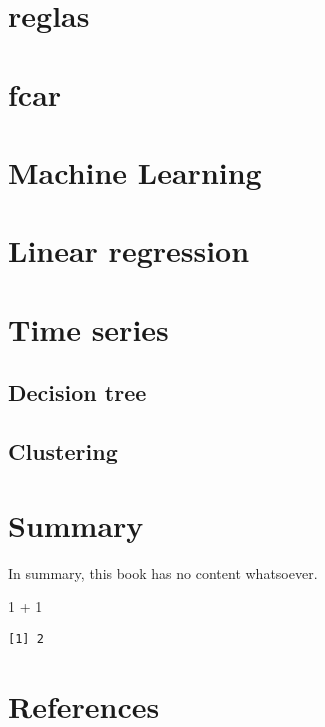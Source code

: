 \documentclass[
  letterpaper,
  DIV=11,
  numbers=noendperiod]{scrreprt}
\newenvironment{Shaded}{\begin{snugshade}}{\end{snugshade}}
\newcommand{\DecValTok}[1]{\textcolor[rgb]{0.68,0.00,0.00}{#1}}
\newcommand{\SpecialCharTok}[1]{\textcolor[rgb]{0.37,0.37,0.37}{#1}}
\newlength{\cslhangindent}
\newlength{\cslentryspacingunit} %
\newenvironment{CSLReferences}[2] %
 {%
  \setlength{\parindent}{0pt}
  \ifodd #1
  \let\oldpar\par
  \def\par{\hangindent=\cslhangindent\oldpar}
  \fi
  \setlength{\parskip}{#2\cslentryspacingunit}
 }%
 {}
\begin{document}
\hypertarget{reglas}{%
\chapter{reglas}\label{reglas}}


\hypertarget{fcar}{%
\chapter{fcar}\label{fcar}}


\hypertarget{machine-learning}{%
\chapter{Machine Learning}\label{machine-learning}}


\hypertarget{linear-regression}{%
\chapter{Linear regression}\label{linear-regression}}


\hypertarget{time-series}{%
\chapter{Time series}\label{time-series}}

\hypertarget{decision-tree}{%
\section{Decision tree}\label{decision-tree}}

\hypertarget{clustering}{%
\section{Clustering}\label{clustering}}


\hypertarget{summary}{%
\chapter{Summary}\label{summary}}

In summary, this book has no content whatsoever.

\begin{Shaded}
\begin{Highlighting}[]
\DecValTok{1} \SpecialCharTok{+} \DecValTok{1}
\end{Highlighting}
\end{Shaded}

\begin{verbatim}
[1] 2
\end{verbatim}


\hypertarget{references}{%
\chapter*{References}\label{references}}


\hypertarget{refs}{}
\begin{CSLReferences}{0}{0}
\end{CSLReferences}
\end{document}
